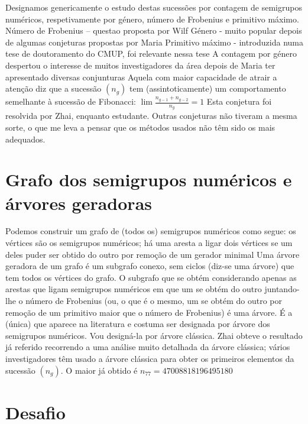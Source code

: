 \documentclass[12pt,a4paper]{article}
\numberwithin{table}{section}
\numberwithin{figure}{section}
\numberwithin{equation}{section}
\theoremstyle{definition}
\theoremstyle{remark}
\begin{document}
Designamos genericamente o estudo destas sucessões por contagem de semigrupos numéricos, respetivamente por género, número de Frobenius e primitivo máximo.
Número de Frobenius – questao proposta por Wilf
Género - muito popular depois de algumas conjeturas propostas por Maria
Primitivo máximo - introduzida numa tese de doutoramento do CMUP, foi relevante nessa tese
A contagem por género despertou o interesse de muitos investigadores da área depois de Maria ter apresentado diversas conjunturas
Aquela com maior capacidade de atrair a atenção diz que a sucessão \(\left(n_g\right)\) tem (assintoticamente) um comportamento semelhante à sucessão de Fibonacci: \(\lim \frac{n_{g-1}+n_{g-2}}{n_g} = 1\)
Esta conjetura foi resolvida por Zhai, enquanto estudante. Outras conjeturas não tiveram a mesma sorte, o que me leva a pensar que os métodos usados não têm sido os mais adequados.



\section{Grafo dos semigrupos numéricos e árvores geradoras}\label{sec:NSgraph}

Podemos construir um grafo de (todos os) semigrupos numéricos como segue: os vértices são os semigrupos numéricos; há uma aresta a ligar dois vértices se um deles puder ser obtido do outro por remoção de um gerador minimal 
Uma árvore geradora de um grafo é um subgrafo conexo, sem ciclos (diz-se uma árvore) que tem todos os vértices do grafo.
O subgrafo que se obtém considerando apenas as arestas que ligam semigrupos numéricos em que um se obtém do outro juntando-lhe o número de Frobenius (ou, o que é o mesmo, um se obtém do outro por remoção de um primitivo maior que o número de Frobenius) é uma árvore. É a (única) que aparece na literatura e costuma ser designada por árvore dos semigrupos numéricos. Vou designá-la por árvore clássica. Zhai obteve o resultado já referido recorrendo a uma análise muito detalhada da árvore clássica; vários investigadores têm usado a árvore clássica para obter os primeiros elementos da sucessão \(\left(n_g\right)\). O maior já obtido é \(n_{77} = \num{47008818196495180}\)


\section{Desafio}\label{sec:desafio}
\end{document}
